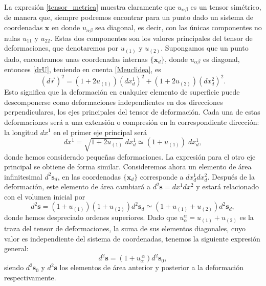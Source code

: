 La expresión \eqref{tensor_metrica} muestra claramente que $u_{\alpha\beta}$
es un tensor simétrico, de manera que, siempre 
podremos encontrar para un punto dado un sistema de coordenadas $\mathbf{x}$ en donde
$u_{\alpha\beta}$ sea diagonal, es decir, con las únicas componentes no nulas
$u_{11}$ y $u_{22}$. Estas dos componentes son los valores
principales del tensor de deformaciones, que denotaremos por $u_{(1)}$ y
$u_{(2)}$. Supongamos que un punto dado, encontramos unas coordenadas internas
$\{\mathbf{x}_d\}$, donde $u_{\alpha\beta}$ es diagonal, entonces \eqref{drU},
teniendo en cuenta \eqref{Meuclidea}, es 
\begin{equation*}
(d\vec{r})^2=(1+2u_{(1)})(dx_d^{1})^2+(1+2u_{(2)})(dx_d^{2})^2.
\end{equation*}
Esto significa que la deformación en cualquier elemento de superficie puede
descomponerse como deformaciones independientes en dos direcciones
perpendiculares, los ejes principales del tensor de deformación. Cada una de
estas deformaciones será a una extensión o compresión en la correspondiente
dirección: la longitud $dx^1$ en el primer eje principal será
\begin{equation*}
dx^1=\sqrt{1+2u_{(1)}}\; dx^1_d\simeq (1+u_{(1)})\; dx^1_d,
\end{equation*}
donde hemos considerado pequeñas deformaciones. La expresión para el otro eje
principal se obtiene de forma similar. Consideremos ahora un elemento
de área infinitesimal $d^2\mathbf{s}_d$, en las coordenadas $\{\mathbf{x}_d\}$
corresponde a $dx_d^1dx_d^2$. Después de la deformación, este elemento de área
cambiará a $d^2\mathbf{s}=dx^1dx^2$ y estará relacionado con el volumen inicial por
\begin{equation*}
d^2\mathbf{s}=(1+u_{(1)})(1+u_{(2)})d^2\mathbf{s}_d\simeq (1+u_{(1)}+u_{(2)})d^2\mathbf{s}_d,
\end{equation*}
donde hemos despreciado ordenes superiores. Dado que
$u_{\alpha}^{\alpha}=u_{(1)}+u_{(2)}$ es la traza del tensor de deformaciones, la
suma de sus elementos diagonales, cuyo valor es independiente del sistema de
coordenadas, tenemos la siguiente expresión general:
\begin{equation}\label{deformacion_area}
d^2\mathbf{s}=(1+u_{\alpha}^{\ \alpha})d^2\mathbf{s}_0,
\end{equation}
siendo $d^2\mathbf{s}_0$ y $d^2\mathbf{s}$ los elementos de área anterior y
posterior a la deformación respectivamente.

